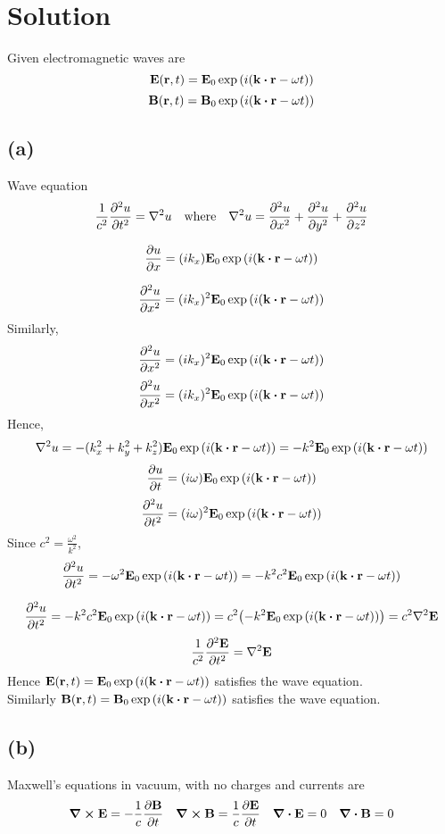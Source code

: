 \section*{Solution}

Given electromagnetic waves are \[\vb{E}(\vb{r},t)=\vb{E}_0\exp\qty(i\qty(\vb{k}\vdot\vb{r}-\omega{t}))\]
\[\vb{B}(\vb{r},t)=\vb{B}_0\exp\qty(i\qty(\vb{k}\vdot\vb{r}-\omega{t}))\]
\subsection*{(a)}
Wave equation \[\frac{1}{c^2}\pdv[2]{u}{t}=\laplacian{u}\qq{where}\laplacian{u}=\pdv[2]{u}{x}+\pdv[2]{u}{y}+\pdv[2]{u}{z}\]

\[\pdv{u}{x}=(ik_x)\vb{E}_0\exp\qty(i\qty(\vb{k}\vdot\vb{r}-\omega{t}))\]

\[\pdv[2]{u}{x}=(ik_x)^2\vb{E}_0\exp\qty(i\qty(\vb{k}\vdot\vb{r}-\omega{t}))\]
Similarly,
\[\pdv[2]{u}{x}=(ik_x)^2\vb{E}_0\exp\qty(i\qty(\vb{k}\vdot\vb{r}-\omega{t}))\]
\[\pdv[2]{u}{x}=(ik_x)^2\vb{E}_0\exp\qty(i\qty(\vb{k}\vdot\vb{r}-\omega{t}))\]
Hence,
\[\laplacian{u}=-(k^2_x+k^2_y+k^2_z)\vb{E}_0\exp\qty(i\qty(\vb{k}\vdot\vb{r}-\omega{t}))=-k^2\vb{E}_0\exp\qty(i\qty(\vb{k}\vdot\vb{r}-\omega{t}))\]
\[\pdv{u}{t}=(i\omega)\vb{E}_0\exp\qty(i\qty(\vb{k}\vdot\vb{r}-\omega{t}))\]
\[\pdv[2]{u}{t}=(i\omega)^2\vb{E}_0\exp\qty(i\qty(\vb{k}\vdot\vb{r}-\omega{t}))\]
Since $c^2=\frac{\omega^2}{k^2}$,
\[\pdv[2]{u}{t}=-\omega^2\vb{E}_0\exp\qty(i\qty(\vb{k}\vdot\vb{r}-\omega{t}))=-k^2c^2\vb{E}_0\exp\qty(i\qty(\vb{k}\vdot\vb{r}-\omega{t}))\]

\[\pdv[2]{u}{t}=-k^2c^2\vb{E}_0\exp\qty(i\qty(\vb{k}\vdot\vb{r}-\omega{t}))=c^2\qty(-k^2\vb{E}_0\exp\qty(i\qty(\vb{k}\vdot\vb{r}-\omega{t})))=c^2\laplacian{\vb{E}}\]
\[\frac{1}{c^2}\pdv[2]{\vb{E}}{t}=\laplacian{\vb{E}}\]
Hence $\vb{E}(\vb{r},t)=\vb{E}_0\exp\qty(i\qty(\vb{k}\vdot\vb{r}-\omega{t}))$ satisfies the wave equation.\\
Similarly $\vb{B}(\vb{r},t)=\vb{B}_0\exp\qty(i\qty(\vb{k}\vdot\vb{r}-\omega{t}))$ satisfies the wave equation.
\subsection*{(b)}
Maxwell's equations in vacuum, with no charges and currents are
\[\curl{\vb{E}}=-\frac{1}{c}\pdv{\vb{B}}{t}\quad\curl{\vb{B}}=\frac{1}{c}\pdv{\vb{E}}{t}\quad\div{\vb{E}}=0\quad\div{\vb{B}}=0\]
